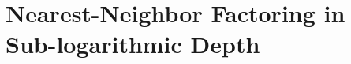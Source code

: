 \chapter{Nearest-Neighbor Factoring in Sub-logarithmic Depth}
\label{chap:factor-sublog}









%

